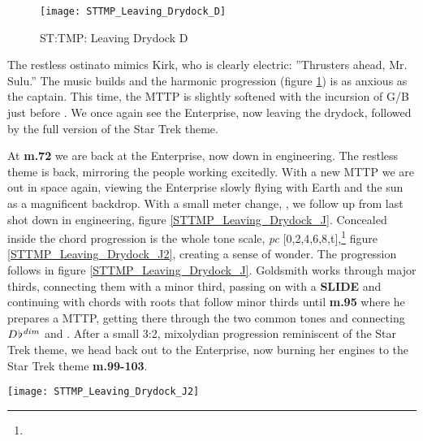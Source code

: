 \begin{figure}[h!]
\center
\texttt{[image: STTMP\_Leaving\_Drydock\_D]}
	\caption{ST:TMP: Leaving Drydock D}
	\label{STTMP_Leaving_Drydock_D}
\end{figure}
The restless ostinato mimics Kirk, who is clearly electric: ''Thrusters ahead, Mr. Sulu.'' The music builds and the harmonic progression (figure \ref{STTMP_Leaving_Drydock_D}) is as anxious as the captain. This time, the \ac{MTTP} is slightly softened with the incursion of G/B just before \bflat. We once again see the Enterprise, now leaving the drydock, followed by the full version of the Star Trek theme. 

At \textbf{m.72} we are back at the Enterprise, now down in engineering. The restless theme is back, mirroring the people working excitedly. With a new \ac{MTTP} we are out in space again, viewing the Enterprise slowly flying with Earth and the sun as a magnificent backdrop.
With a small meter change, , we follow up from last shot down in engineering, figure \ref{STTMP_Leaving_Drydock_J}. Concealed inside the chord progression is the whole tone scale, \textit{pc} [0,2,4,6,8,t],\footnote{} figure \ref{STTMP_Leaving_Drydock_J2}, creating a sense of wonder. The progression follows in figure \ref{STTMP_Leaving_Drydock_J}. Goldsmith works through major thirds, connecting them with a minor third, passing on with a \textbf{SLIDE} and continuing with chords with roots that follow minor thirds until \textbf{m.95} where he prepares a \ac{MTTP}, getting there through the two common tones \fiss and \aiss connecting \(D\hspace*{0.18ex}\flat\hspace*{0.18ex}^{dim}\) and \fiss. After a small 3:2, mixolydian progression reminiscent of the Star Trek theme, we head back out to the Enterprise, now burning her engines to the Star Trek theme \textbf{m.99-103}.

\begin{figure*}
\texttt{[image: STTMP\_Leaving\_Drydock\_J2]}
	\caption{ST:TMP: Leaving Drydock J: Whole Tone Scale}
	\label{STTMP_Leaving_Drydock_J2}
\end{figure*}

